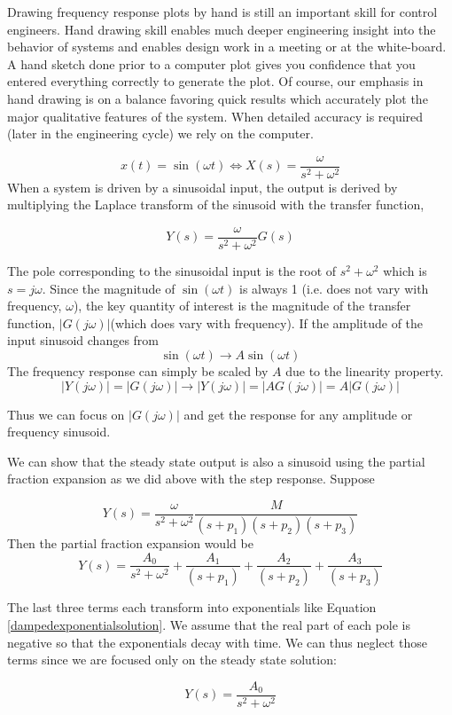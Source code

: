 Drawing frequency response plots by hand is still an important skill for control engineers.  Hand drawing skill enables much deeper engineering insight into the behavior of systems and enables design work in a meeting or at the white-board.  A hand sketch done prior to a computer plot gives you confidence that you entered everything correctly to generate the plot.  Of course, our emphasis in hand drawing  is on a balance favoring quick results which accurately plot the major qualitative features of the system.  When detailed accuracy is required (later in the engineering cycle) we rely on the computer.

\[
x(t) = \sin(\omega t)   \Leftrightarrow X(s) = \frac{\omega}{s^2 + \omega^2}
\]
When a system is driven by a sinusoidal input, the output is derived by multiplying the Laplace transform of the sinusoid with the transfer function,

\[
Y(s) =  \frac{\omega}{s^2 + \omega^2} G(s)
\]

The pole corresponding to the sinusoidal input is the root of $s^2+\omega^2$ which is $s=j\omega$.  Since the magnitude of $\sin(\omega t)$ is always 1 (i.e. does not vary with frequency, $\omega$), the key quantity of interest  is the magnitude of the  transfer function, $|G(j\omega)|$(which does vary with frequency).  If the amplitude of the input sinusoid changes from
\[
\sin(\omega t) \to A\sin(\omega t)
\]
The frequency response can simply be scaled by $A$ due to the linearity property.
\[
|Y(j\omega)| = |G(j\omega)| \to |Y(j\omega)| =|AG(j\omega)|=A|G(j\omega)|
\]

Thus we can focus on $|G(j\omega)|$ and get the response for any amplitude or frequency sinusoid.

We can show that the steady state output is also a sinusoid using the partial fraction expansion as we did above with the step response.   Suppose

\[
Y(s) = \frac{\omega}{s^2 + \omega^2} \frac  {M}   {(s+p_1)(s+p_2)(s+p_3)}
\]
Then the partial fraction expansion would be
\[
Y(s) =  \frac{A_0} {s^2+\omega^2} +  \frac{A_1} {(s+p_1)} +  \frac{A_2} {(s+p_2)} +  \frac{A_3} {(s+p_3)}
\]

The last three terms each transform into exponentials like Equation \ref{dampedexponentialsolution}.
We assume that the real part of each pole is negative so that the exponentials decay with time.   We can thus neglect those terms since we are focused only on the steady state solution:


\[
Y(s) =  \frac{A_0} {s^2+\omega^2}
\]

